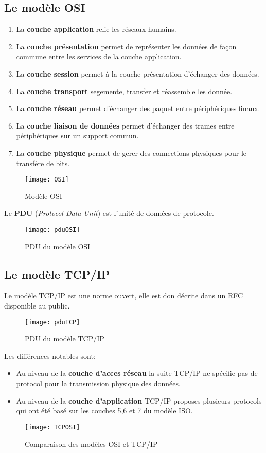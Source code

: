  \subsection{Le modèle OSI}

 \begin{enumerate}
 \item La \textbf{couche application} relie les réseaux humains.
 \item La \textbf{couche présentation} permet de représenter les données de façon commune entre les services de la couche application.
 \item La \textbf{couche session} permet à la couche présentation d'échanger des données.
 \item La \textbf{couche transport} segemente, transfer et réassemble les donnée.
 \item La \textbf{couche réseau} permet d'échanger des paquet entre périphériques finaux.
 \item La \textbf{couche liaison de données} permet d'échanger des trames entre périphériques sur un support commun.
 \item La \textbf{couche physique} permet de gerer des connections physiques pour le transfère de bits.
 \end{enumerate}

 \begin{figure}[h]
	 \centering
	 \texttt{[image: OSI]}
	 \caption{Modèle OSI}
 \end{figure}

 Le \textbf{PDU} (\textit{Protocol Data Unit}) est l'unité de données de protocole.

 \begin{figure}[h]
	 \centering
	 \texttt{[image: pduOSI]}
	 \caption{PDU du modèle OSI}
 \end{figure}

 \subsection{Le modèle TCP/IP}

 Le modèle TCP/IP est une norme ouvert, elle est don décrite dans un RFC disponible au public.

 \begin{figure}[h]
	 \centering
	 \texttt{[image: pduTCP]}
	 \caption{PDU du modèle TCP/IP}
 \end{figure}

 Les différences notables sont:
 \begin{itemize}
	 \item Au niveau de la \textbf{couche d'acces réseau} la suite TCP/IP ne spécifie pas de protocol pour la transmission physique des données.
	 \item Au niveau de la \textbf{couche d'application} TCP/IP proposes plusieurs protocols qui ont été basé sur les couches 5,6 et 7 du modèle ISO\@.
 \end{itemize}
 \begin{figure}[h]
	 \centering
	 \texttt{[image: TCPOSI]}
	 \caption{Comparaison des modèles OSI et TCP/IP}
 \end{figure}

